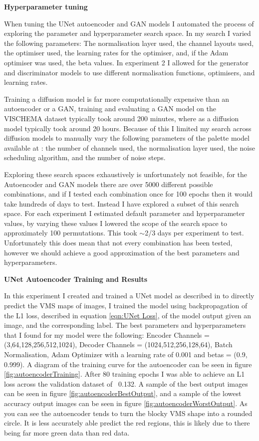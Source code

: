 \documentclass{UoYCSproject}
\begin{document}
\textbf{Hyperparameter tuning}

When tuning the UNet autoencoder and GAN models I automated the process of exploring the parameter and hyperparameter search space. In my search I varied the following parameters: The normalisation layer used, the channel layouts used, the optimiser used, the learning rates for the optimiser, and, if the Adam optimiser was used, the beta values. In experiment 2 I allowed for the generator and discriminator models to use different normalisation functions, optimisers, and learning rates. 

Training a diffusion model is far more computationally expensive than an autoencoder or a GAN, training and evaluating a GAN model on the VISCHEMA dataset typically took around 200 minutes, where as a diffusion model typically took around 20 hours. 
Because of this I limited my search across diffusion models to manually vary the following parameters of the palette model available at \cite{JanspiryPalette}: the number of channels used, the normalisation layer used, the noise scheduling algorithm, and the number of noise steps.

Exploring these search spaces exhaustively is unfortunately not feasible, for the Autoencoder and GAN models there are over 5000 different possible combinations, and if I tested each combination once for 100 epochs then it would take hundreds of days to test.
Instead I have explored a subset of this search space. For each experiment I estimated default parameter and hyperparameter values, by varying these values I lowered the scope of the search space to approximately 100 permutations. This took \(\sim\)2/3 days per experiment to test. Unfortunately this does mean that not every combination has been tested, however we should achieve a good approximation of the best parameters and hyperparameters.

\textbf{UNet Autoencoder Training and Results}

In this experiment I created and trained a UNet model as described in \cite{ronneberger2015unet} to directly predict the VMS maps of images, I trained the model using backpropagation of the L1 loss, described in equation \ref{eqn:UNet Loss}, of the model output given an image, and the corresponding label. The best parameters and hyperparameters that I found for my model were the following: Encoder Channels = (3,64,128,256,512,1024), Decoder Channels = (1024,512,256,128,64), Batch Normalisation, Adam Optimizer with a learning rate of 0.001 and betas = (0.9, 0.999). A diagram of the training curve for the autoencoder can be seen in figure \ref{fig:autoencoderTraining}. After 80 training epochs I was able to achieve an L1 loss across the validation dataset of ~0.132. A sample of the best output images can be seen in figure \ref{fig:autoencoderBestOutput}, and a sample of the lowest accuracy output images can be seen in figure \ref{fig:autoencoderWorstOutput}. As you can see the autoencoder tends to turn the blocky VMS shape into a rounded circle. It is less accurately able predict the red regions, this is likely due to there being far more green data than red data.
\end{document}
